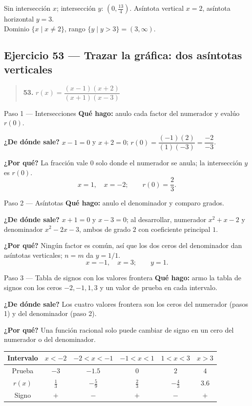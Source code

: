 \documentclass[11pt]{article}
\begin{document}
\begin{resp}
Sin intersección $x$; intersección $y$: $\left(0,\tfrac{13}{4}\right)$. Asíntota vertical $x=2$, asíntota horizontal $y=3$.\\
Dominio $\{x\mid x\ne 2\}$, rango $\{y\mid y>3\}=(3,\infty)$.
\end{resp}

\subsection*{Ejercicio 53 — Trazar la gráfica: dos asíntotas verticales}

\begin{quote}
\textbf{53.} $r(x)=\dfrac{(x-1)(x+2)}{(x+1)(x-3)}$
\end{quote}

\begin{paso}{Paso 1 --- Intersecciones}
\textbf{Qué hago:} anulo cada factor del numerador y evalúo $r(0)$.

\textbf{¿De dónde sale?} $x-1=0$ y $x+2=0$; $r(0)=\dfrac{(-1)(2)}{(1)(-3)}=\dfrac{-2}{-3}$.

\textbf{¿Por qué?} La fracción vale $0$ solo donde el numerador se anula; la intersección $y$ es $r(0)$.
\[
x=1,\quad x=-2;\qquad r(0)=\frac23 .
\]
\end{paso}

\begin{paso}{Paso 2 --- Asíntotas}
\textbf{Qué hago:} anulo el denominador y comparo grados.

\textbf{¿De dónde sale?} $x+1=0$ y $x-3=0$; al desarrollar, numerador $x^2+x-2$ y denominador $x^2-2x-3$, ambos de grado $2$ con coeficiente principal $1$.

\textbf{¿Por qué?} Ningún factor es común, así que los dos ceros del denominador dan asíntotas verticales; $n=m$ da $y=1/1$.
\[
x=-1,\quad x=3;\qquad y=1 .
\]
\end{paso}

\begin{paso}{Paso 3 --- Tabla de signos con los valores frontera}
\textbf{Qué hago:} armo la tabla de signos con los ceros $-2,-1,1,3$ y un valor de prueba en cada intervalo.

\textbf{¿De dónde sale?} Los cuatro valores frontera son los ceros del numerador (pasos 1) y del denominador (paso 2).

\textbf{¿Por qué?} Una función racional solo puede cambiar de signo en un cero del numerador o del denominador.

\begin{center}
\begin{tabular}{c|ccccc}
Intervalo & $x<-2$ & $-2<x<-1$ & $-1<x<1$ & $1<x<3$ & $x>3$\\\hline
Prueba & $-3$ & $-1.5$ & $0$ & $2$ & $4$\\
$r(x)$ & $\tfrac13$ & $-\tfrac59$ & $\tfrac23$ & $-\tfrac43$ & $3.6$\\
Signo & $+$ & $-$ & $+$ & $-$ & $+$
\end{tabular}
\end{center}
\end{paso}
\end{document}
